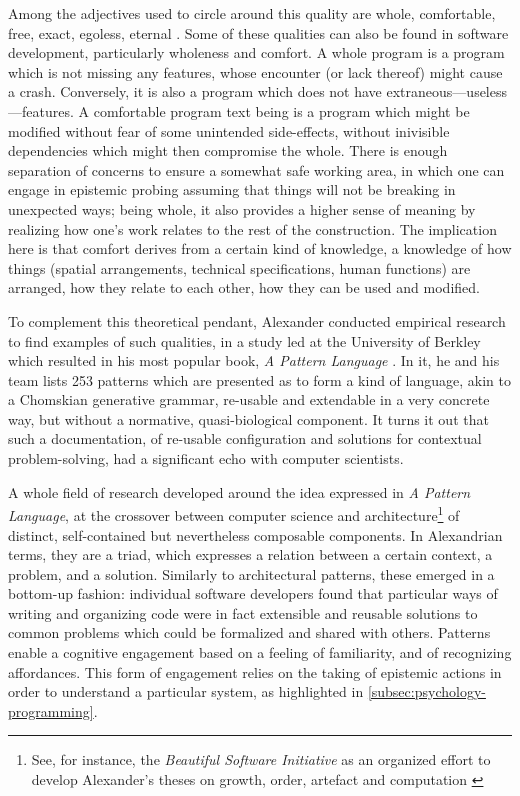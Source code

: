 Among the adjectives used to circle around this quality are whole, comfortable, free, exact, egoless, eternal \citep{alexander_timeless_1979}. Some of these qualities can also be found in software development, particularly wholeness and comfort. A whole program is a program which is not missing any features, whose encounter (or lack thereof) might cause a crash. Conversely, it is also a program which does not have extraneous—useless—features. A comfortable program text being is a program which might be modified without fear of some unintended side-effects, without inivisible dependencies which might then compromise the whole. There is enough separation of concerns to ensure a somewhat safe working area, in which one can engage in epistemic probing assuming that things will not be breaking in unexpected ways; being whole, it also provides a higher sense of meaning by realizing how one's work relates to the rest of the construction. The implication here is that comfort derives from a certain kind of knowledge, a knowledge of how things (spatial arrangements, technical specifications, human functions) are arranged, how they relate to each other, how they can be used and modified.

To complement this theoretical pendant, Alexander conducted empirical research to find examples of such qualities, in a study led at the University of Berkley which resulted in his most popular book, \emph{A Pattern Language} \citep{alexander_pattern_1977}. In it, he and his team lists 253 patterns which are presented as to form a kind of language, akin to a Chomskian generative grammar, re-usable and extendable in a very concrete way, but without a normative, quasi-biological component. It turns it out that such a documentation, of re-usable configuration and solutions for contextual problem-solving, had a significant echo with computer scientists.

A whole field of research developed around the idea expressed in \emph{A Pattern Language}, at the crossover between computer science and architecture\footnote{See, for instance, the \emph{Beautiful Software Initiative} as an organized effort to develop Alexander's theses on growth, order, artefact and computation \citep{bryant_beautiful_2022}} of distinct, self-contained but nevertheless composable components. In Alexandrian terms, they are a triad, which expresses a relation between a certain context, a problem, and a solution. Similarly to architectural patterns, these emerged in a bottom-up fashion: individual software developers found that particular ways of writing and organizing code were in fact extensible and reusable solutions to common problems which could be formalized and shared with others. Patterns enable a cognitive engagement based on a feeling of familiarity, and of recognizing affordances. This form of engagement relies on the taking of epistemic actions in order to understand a particular system, as highlighted in \ref{subsec:psychology-programming}.

